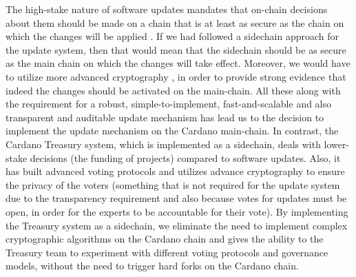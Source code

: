 The high-stake nature of software updates mandates that on-chain decisions
about them should be made on a chain that is at least as secure as the chain on
which the changes will be applied . If we had followed a sidechain approach for
the
update system, then that would mean that the sidechain should be as secure as
the main chain on which the changes will take effect. Moreover, we would have
to utilize more advanced cryptography
\cite{sidechain}, in order to provide strong evidence that indeed the
changes should be activated on the main-chain. All these along with the
requirement for a
robust, simple-to-implement, fast-and-scalable and also transparent and
auditable update mechanism has lead us to the decision to implement the update
mechanism on the Cardano main-chain. In contrast, the Cardano Treasury system,
which is implemented as a sidechain, deals with lower-stake decisions (the
funding of projects) compared to software updates. Also, it has built advanced
voting protocols and utilizes advance cryptography to ensure
the privacy of the voters (something that is not required for the update system
due to the transparency requirement and also because votes for
updates must be open, in order for the experts to be accountable for their
vote). By implementing the Treasury system as a sidechain,
we eliminate the need to implement complex cryptographic algorithms on the
Cardano chain and gives the ability to the Treasury team to experiment with
different voting protocols and governance models, without the need to trigger
hard forks on the Cardano chain.

